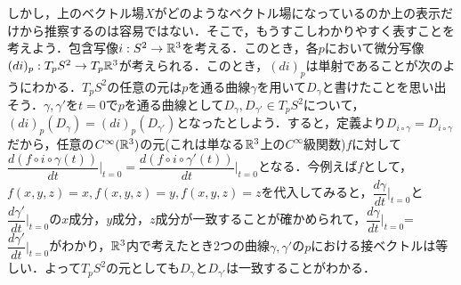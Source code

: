 しかし，上のベクトル場$X$がどのようなベクトル場になっているのか上の表示だけから推察するのは容易ではない．そこで，もうすこしわかりやすく表すことを考えよう．包含写像$i:S^2\rightarrow{\mathbb R}^3$を考える．このとき，各$p$において微分写像$(di)_p:T_pS^2\rightarrow T_p{\mathbb R}^3$が考えられる．このとき，$(di)_p$は単射であることが次のようにわかる．$T_pS^2$の任意の元は$p$を通る曲線$\gamma$を用いて$D_\gamma$と書けたことを思い出そう．$\gamma,\gamma'$を$t=0$で$p$を通る曲線として$D_\gamma,D_{\gamma'}\in T_pS^2$について，$(di)_p(D_\gamma)=(di)_p(D_{\gamma'})$となったとしよう．すると，定義より$D_{i\circ\gamma}=D_{i\circ\gamma}$だから，任意の$C^\infty({\mathbb R}^3)$の元(これは単なる${\mathbb R}^3$上の$C^\infty$級関数)$f$に対して$\dfrac{d(f\circ i\circ\gamma(t))}{dt}\Big|_{t=0}=\dfrac{d(f\circ i\circ\gamma'(t))}{dt}\Big|_{t=0}$となる．今例えば$f$として，$f(x,y,z)=x,f(x,y,z)=y,f(x,y,z)=z$を代入してみると，$\dfrac{d\gamma}{dt}\Big|_{t=0}$と$\dfrac{d\gamma'}{dt}\Big|_{t=0}$の$x$成分，$y$成分，$z$成分が一致することが確かめられて，$\dfrac{d\gamma}{dt}\Big|_{t=0}$=$\dfrac{d\gamma'}{dt}\Big|_{t=0}$がわかり，${\mathbb R}^3$内で考えたとき2つの曲線$\gamma,\gamma'$の$p$における接ベクトルは等しい．よって$T_pS^2$の元としても$D_\gamma$と$D_{\gamma'}$は一致することがわかる．


